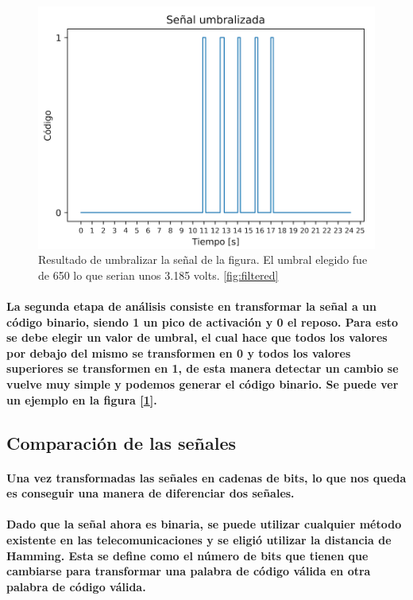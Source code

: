 \documentclass{article}
\begin{document}
\begin{figure}[ht]
    \centering
    \includegraphics[width=\textwidth]{umbralized.png}%
    \caption{Resultado de umbralizar la señal de la figura. El umbral elegido fue de 650 lo que serian unos 3.185 volts.
    \ref{fig:filtered}}
    \label{fig:umbralized}
\end{figure}

\paragraph{
La segunda etapa de análisis consiste en transformar la señal a un código binario, siendo 1 un pico de activación y 0 el reposo. Para esto se debe elegir un valor de umbral, el cual hace que todos los valores por debajo del mismo se transformen en 0 y todos los valores superiores se transformen en 1, de esta manera detectar un cambio se vuelve muy simple y podemos generar el código binario. Se puede ver un ejemplo en la figura [\ref{fig:umbralized}].
}
\subsection{Comparación de las señales}
\paragraph{
Una vez transformadas las señales en cadenas de bits, lo que nos queda es conseguir una manera de diferenciar dos señales.
}
\paragraph{
Dado que la señal ahora es binaria, se puede utilizar cualquier método existente en las telecomunicaciones y se eligió utilizar la distancia de Hamming. Esta se define como el número de bits que tienen que cambiarse para transformar una palabra de código válida en otra palabra de código válida.
}
\end{document}
